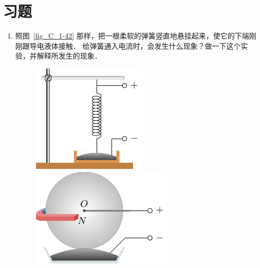 \section*{习题}
\begin{enumerate}
    \item 照图~\ref{fig_C_1-42} 那样，把一根柔软的弹簧竖直地悬挂起来，使它的下端刚刚跟导电液体接触．
    给弹簧通入电流时，会发生什么现象？做一下这个实验，并解释所发生的现象．

\begin{figure}[htbp]
    \centering
    \begin{minipage}[t]{0.48\textwidth}
        \centering
        \includegraphics{fig/C/1-42.pdf}
        \caption{}\label{fig_C_1-42}
    \end{minipage}
    \begin{minipage}[t]{0.48\textwidth}
        \centering
        \includegraphics{fig/C/1-43.pdf}
        \caption{}\label{fig_C_1-43}
    \end{minipage}
\end{figure}


\end{enumerate}

